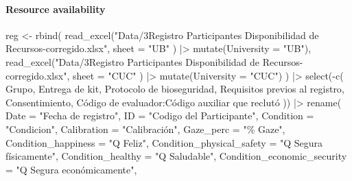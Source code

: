 \documentclass[
  bookmarksnumbered]{article}
\newenvironment{Shaded}{\begin{snugshade}}{\end{snugshade}}
\newcommand{\AttributeTok}[1]{\textcolor[rgb]{0.80,0.80,0.80}{#1}}
\newcommand{\FunctionTok}[1]{\textcolor[rgb]{0.94,0.94,0.56}{#1}}
\newcommand{\NormalTok}[1]{\textcolor[rgb]{0.80,0.80,0.80}{#1}}
\newcommand{\OtherTok}[1]{\textcolor[rgb]{0.94,0.94,0.56}{#1}}
\newcommand{\SpecialCharTok}[1]{\textcolor[rgb]{0.86,0.64,0.64}{#1}}
\newcommand{\StringTok}[1]{\textcolor[rgb]{0.80,0.58,0.58}{#1}}
\begin{document}
\paragraph{Resource availability}\label{resource-availability}

\begin{Shaded}
\begin{Highlighting}[]
\NormalTok{reg }\OtherTok{\textless{}{-}} \FunctionTok{rbind}\NormalTok{(}
  \FunctionTok{read\_excel}\NormalTok{(}\StringTok{"Data/3Registro Participantes Disponibilidad de Recursos{-}corregido.xlsx"}\NormalTok{,}
    \AttributeTok{sheet =} \StringTok{"UB"}
\NormalTok{  ) }\SpecialCharTok{|\textgreater{}}
    \FunctionTok{mutate}\NormalTok{(}\AttributeTok{University =} \StringTok{"UB"}\NormalTok{),}
  \FunctionTok{read\_excel}\NormalTok{(}\StringTok{"Data/3Registro Participantes Disponibilidad de Recursos{-}corregido.xlsx"}\NormalTok{,}
    \AttributeTok{sheet =} \StringTok{"CUC"}
\NormalTok{  ) }\SpecialCharTok{|\textgreater{}}
    \FunctionTok{mutate}\NormalTok{(}\AttributeTok{University =} \StringTok{"CUC"}\NormalTok{)}
\NormalTok{) }\SpecialCharTok{|\textgreater{}}
  \FunctionTok{select}\NormalTok{(}\SpecialCharTok{{-}}\FunctionTok{c}\NormalTok{(}
\NormalTok{    Grupo, }
    \StringTok{\textasciigrave{}}\AttributeTok{Entrega de kit}\StringTok{\textasciigrave{}}\NormalTok{, }
    \StringTok{\textasciigrave{}}\AttributeTok{Protocolo de bioseguridad}\StringTok{\textasciigrave{}}\NormalTok{, }
    \StringTok{\textasciigrave{}}\AttributeTok{Requisitos previos al registro}\StringTok{\textasciigrave{}}\NormalTok{, }
\NormalTok{    Consentimiento,}
    \StringTok{\textasciigrave{}}\AttributeTok{Código de evaluador}\StringTok{\textasciigrave{}}\SpecialCharTok{:}\StringTok{\textasciigrave{}}\AttributeTok{Código auxiliar que reclutó}\StringTok{\textasciigrave{}}
\NormalTok{  )) }\SpecialCharTok{|\textgreater{}}
  \FunctionTok{rename}\NormalTok{(}
    \AttributeTok{Date =} \StringTok{"Fecha de registro"}\NormalTok{,}
    \AttributeTok{ID =} \StringTok{"Codigo del Participante"}\NormalTok{,}
    \AttributeTok{Condition =} \StringTok{"Condicion"}\NormalTok{,}
    \AttributeTok{Calibration =} \StringTok{"Calibración"}\NormalTok{,}
    \AttributeTok{Gaze\_perc =} \StringTok{"\% Gaze"}\NormalTok{,}
    \AttributeTok{Condition\_happiness =} \StringTok{"Q Feliz"}\NormalTok{,}
    \AttributeTok{Condition\_physical\_safety =} \StringTok{"Q Segura físicamente"}\NormalTok{,}
    \AttributeTok{Condition\_healthy =} \StringTok{"Q Saludable"}\NormalTok{,}
    \AttributeTok{Condition\_economic\_security =} \StringTok{"Q Segura económicamente"}\NormalTok{,}

\end{Highlighting}
\end{Shaded}
\end{document}
